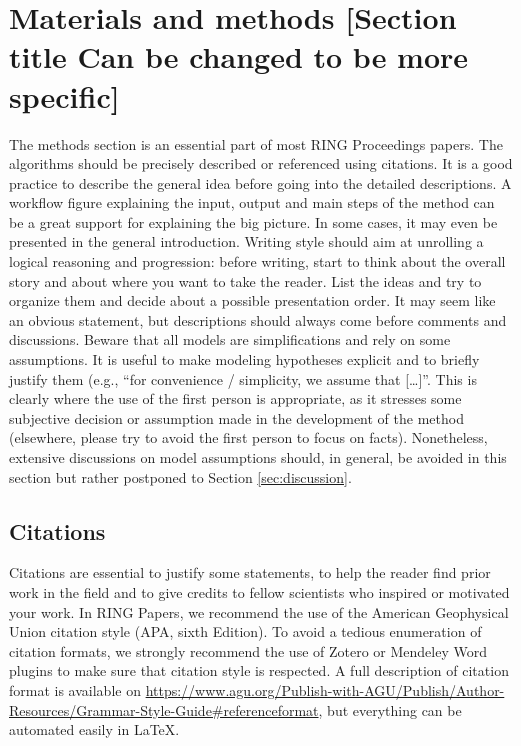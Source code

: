 \documentclass[final]{ring}
\begin{document}
\section{Materials and methods [Section title Can be changed to be more specific]}
\label{Method}

The methods section is an essential part of most RING Proceedings papers. The algorithms should be precisely described or referenced using citations. It is a good practice to describe the general idea before going into the detailed descriptions. A workflow figure explaining the input, output and main steps of the method can be a great support for explaining the big picture. In some cases, it may even be presented in the general introduction. 
Writing style should aim at unrolling a logical reasoning and progression: before writing, start to think about the overall story and about where you want to take the reader. List the ideas and try to organize them and decide about a possible presentation order. It may seem like an obvious statement, but descriptions should always come before comments and discussions. Beware that all models are simplifications and rely on some assumptions. It is useful to make modeling hypotheses explicit and to briefly justify them (e.g., ``for convenience / simplicity, we assume that […]''. This is clearly where the use of the first person is appropriate, as it stresses some subjective decision or assumption made in the development of the method (elsewhere, please try to avoid the first person to focus on facts). Nonetheless, extensive discussions on model assumptions should, in general, be avoided in this section but rather postponed to Section \ref{sec:discussion}.

\subsection{Citations}

Citations are essential to justify some statements, to help the reader find prior work in the field and to give credits to fellow scientists who inspired or motivated your work. In RING Papers, we recommend the use of the American Geophysical Union citation style (APA, sixth Edition). To avoid a tedious enumeration of citation formats, we strongly recommend the use of Zotero or Mendeley Word plugins to make sure that citation style is respected. A full description of citation format is available on \url{https://www.agu.org/Publish-with-AGU/Publish/Author-Resources/Grammar-Style-Guide#referenceformat}, but everything can be automated easily in \LaTeX.
\end{document}
